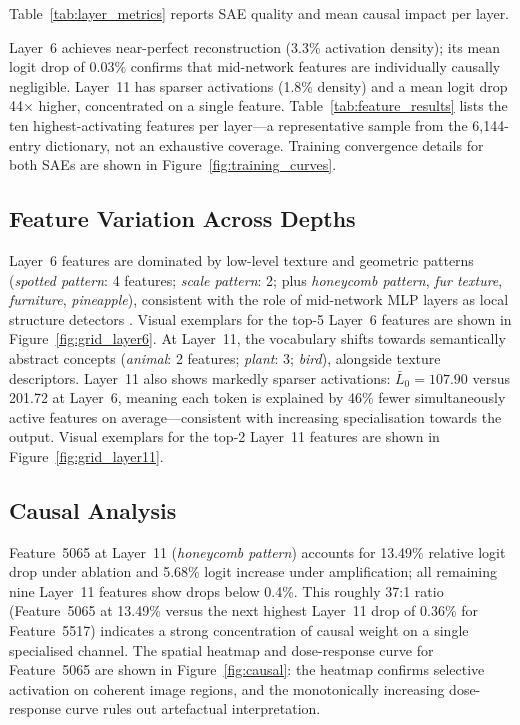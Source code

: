 Table~\ref{tab:layer_metrics} reports SAE quality and mean causal impact per layer.

Layer~6 achieves near-perfect reconstruction (3.3\% activation density); its mean logit drop of 0.03\% confirms that mid-network features are individually causally negligible. Layer~11 has sparser activations (1.8\% density) and a mean logit drop 44$\times$ higher, concentrated on a single feature. Table~\ref{tab:feature_results} lists the ten highest-activating features per layer---a representative sample from the 6,144-entry dictionary, not an exhaustive coverage. Training convergence details for both SAEs are shown in Figure~\ref{fig:training_curves}.

\subsection{Feature Variation Across Depths}

Layer~6 features are dominated by low-level texture and geometric patterns (\textit{spotted pattern}: 4 features; \textit{scale pattern}: 2; plus \textit{honeycomb pattern}, \textit{fur texture}, \textit{furniture}, \textit{pineapple}), consistent with the role of mid-network MLP layers as local structure detectors \cite{Raghu2021}. Visual exemplars for the top-5 Layer~6 features are shown in Figure~\ref{fig:grid_layer6}. At Layer~11, the vocabulary shifts towards semantically abstract concepts (\textit{animal}: 2 features; \textit{plant}: 3; \textit{bird}), alongside texture descriptors. Layer~11 also shows markedly sparser activations: $\bar{L}_0=107.90$ versus 201.72 at Layer~6, meaning each token is explained by 46\% fewer simultaneously active features on average---consistent with increasing specialisation towards the output. Visual exemplars for the top-2 Layer~11 features are shown in Figure~\ref{fig:grid_layer11}.

\subsection{Causal Analysis}

Feature~5065 at Layer~11 (\textit{honeycomb pattern}) accounts for 13.49\% relative logit drop under ablation and 5.68\% logit increase under amplification; all remaining nine Layer~11 features show drops below 0.4\%. This roughly 37:1 ratio (Feature~5065 at 13.49\% versus the next highest Layer~11 drop of 0.36\% for Feature~5517) indicates a strong concentration of causal weight on a single specialised channel. The spatial heatmap and dose-response curve for Feature~5065 are shown in Figure~\ref{fig:causal}: the heatmap confirms selective activation on coherent image regions, and the monotonically increasing dose-response curve rules out artefactual interpretation.

